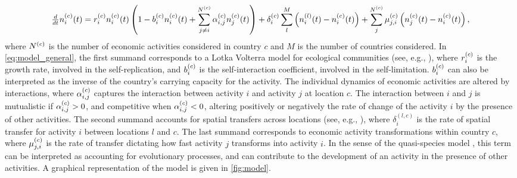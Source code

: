 \begin{equation}\label{eq:model_general}
    \tfrac{d}{dt} n_i^{(c)}(t)  = r_i^{(c)}  n_i^{(c)}(t) \left(1 -   b_i^{(c)}  n_i^{(c)}(t)  + \sum_{j \neq i}^{N^{(c)}} \alpha^{(c)} _{i,j} n_j^{(c)}(t) \right) + \delta^{(c)}_{i} \sum_l^M \left( n_i^{(l)}(t) - n_i^{(c)}(t)  \right) + \sum_j^{N^{(c)}} \mu^{(c)} _{j,i}\left( n_j^{(c)}(t)  - n_i^{(c)}(t)  \right),
\end{equation}
where $N^{(c)}$ is the number of economic activities considered in country $c$ and $M$ is the number of countries considered.
% 
In \cref{eq:model_general}, the first summand corresponds to a Lotka Volterra model for ecological communities (see, e.g., \citep{Bunin2017,Scheffer2006a,Case1990}), where  $r_i^{(c)} $ is the growth rate, involved in the self-replication, and $b_i^{(c)} $ is the self-interaction coefficient, involved in the self-limitation. $b_i^{(c)} $ can also be interpreted as the inverse of the country's carrying capacity for the activity. %
%
The individual dynamics of economic activities are altered by interactions, where $\alpha_{i,j}^{(c)} $ captures the interaction between activity $ i $ and activity $ j $ at location $c$. The interaction between $i$ and $j$ is mutualistic if $\alpha_{i,j}^{(c)}  > 0$, and competitive when $\alpha_{i,j}^{(c)}  < 0$, altering positively or negatively the rate of change of the activity $i$ by the presence of other activities.
%
The second summand accounts for spatial transfers across locations (see, e.g., \citep{Tilman1994b}), where $\delta^{(l,c)}_{i}$ is the rate of spatial transfer for activity $i$ between locations $l$ and $c$.
% 
The last summand corresponds to economic activity transformations within country $c$, where $\mu^{(c)} _{j,i}$ is the rate of transfer dictating how fast activity $j$ transforms into activity $i$. In the sense of the quasi-species model \citep{eigen1988molecular}, this term can be interpreted as accounting for evolutionary processes, and can contribute to the development of an activity in the presence of other activities.
%
A graphical representation of the model is given in \cref{fig:model}.

